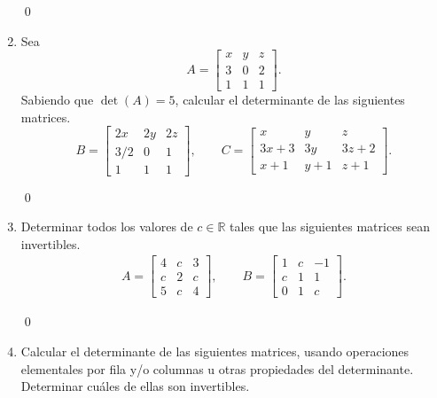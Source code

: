 \begin{enumerate}[topsep=6pt,itemsep=.4cm]
    \qed
    
    \item  Sea
    $$A=
    \begin{bmatrix}
        x&y&z \\
        3&0&2\\
        1&1&1
    \end{bmatrix}.$$
    Sabiendo que $\det(A) = 5$, calcular el determinante de las siguientes matrices.
    $$
    B = \begin{bmatrix}
    2x&2y&2z \\
    3/2&0&1\\
    1&1&1
    \end{bmatrix}, \qquad
    C=
    \begin{bmatrix}
        x&y&z \\
        3x+3&3y&3z+2\\
        x+1&y+1&z+1
    \end{bmatrix}.
    $$
    \rta

    \qed
    
    \item Determinar todos los valores de $c\in\mathbb{R}$ tales que las siguientes matrices sean invertibles.
    \begin{align*}
    A=\begin{bmatrix}4& c&3\\c&2&c\\ 5&c&4 \end{bmatrix},\qquad
    B=\begin{bmatrix} 1&c&-1\\ c&1&1\\0&1&c\end{bmatrix}.
    \end{align*}
    \rta

    \qed
    
    \item Calcular el determinante de las siguientes matrices, usando operaciones elementales por fila y/o columnas u otras propiedades del determinante. Determinar cuáles de ellas son invertibles.
    

\end{enumerate}
